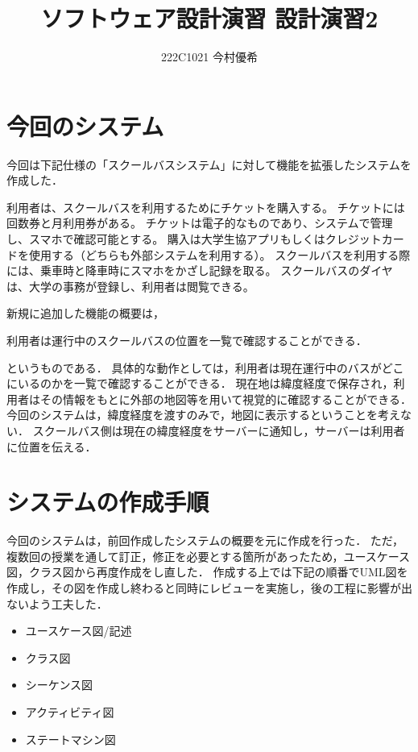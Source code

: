 \documentclass[documentclass]{jsarticle}
\begin{document}
\title{ソフトウェア設計演習 設計演習2}
\author{222C1021 今村優希}
\maketitle

\clearpage

\newpage

\section{今回のシステム}

今回は下記仕様の「スクールバスシステム」に対して機能を拡張したシステムを作成した．


\begin{tcolorbox}
  利用者は、スクールバスを利用するためにチケットを購入する。
  チケットには回数券と月利用券がある。
  チケットは電子的なものであり、システムで管理し、スマホで確認可能とする。
  購入は大学生協アプリもしくはクレジットカードを使用する（どちらも外部システムを利用する）。
  スクールバスを利用する際には、乗車時と降車時にスマホをかざし記録を取る。
  スクールバスのダイヤは、大学の事務が登録し、利用者は閲覧できる。
\end{tcolorbox}

新規に追加した機能の概要は，
\begin{tcolorbox}
  利用者は運行中のスクールバスの位置を一覧で確認することができる．
\end{tcolorbox}
というものである．
具体的な動作としては，利用者は現在運行中のバスがどこにいるのかを一覧で確認することができる．
現在地は緯度経度で保存され，利用者はその情報をもとに外部の地図等を用いて視覚的に確認することができる．
今回のシステムは，緯度経度を渡すのみで，地図に表示するということを考えない．
スクールバス側は現在の緯度経度をサーバーに通知し，サーバーは利用者に位置を伝える．

\section{システムの作成手順}

今回のシステムは，前回作成したシステムの概要を元に作成を行った．
ただ，複数回の授業を通して訂正，修正を必要とする箇所があったため，ユースケース図，クラス図から再度作成をし直した．
作成する上では下記の順番でUML図を作成し，その図を作成し終わると同時にレビューを実施し，後の工程に影響が出ないよう工夫した．
\begin{itemize}
  \item ユースケース図/記述
  \item クラス図
  \item シーケンス図
  \item アクティビティ図
  \item ステートマシン図
\end{itemize}
\end{document}
